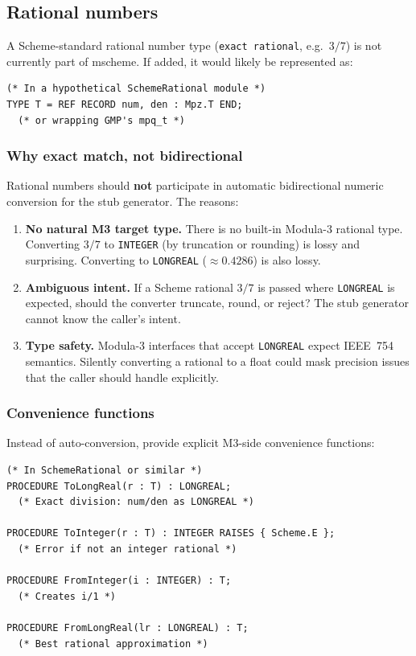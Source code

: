 \documentclass[11pt]{article}
\begin{document}
\subsection{Rational numbers}

A Scheme-standard rational number type (\texttt{exact rational},
e.g.\ $3/7$) is not currently part of mscheme.  If added, it would
likely be represented as:

\begin{lstlisting}
(* In a hypothetical SchemeRational module *)
TYPE T = REF RECORD num, den : Mpz.T END;
  (* or wrapping GMP's mpq_t *)
\end{lstlisting}

\subsubsection{Why exact match, not bidirectional}

Rational numbers should \textbf{not} participate in automatic
bidirectional numeric conversion for the stub generator.  The reasons:

\begin{enumerate}
\item \textbf{No natural M3 target type.}  There is no built-in
  Modula-3 rational type.  Converting $3/7$ to \texttt{INTEGER} (by
  truncation or rounding) is lossy and surprising.  Converting to
  \texttt{LONGREAL} ($\approx 0.4286$) is also lossy.

\item \textbf{Ambiguous intent.}  If a Scheme rational $3/7$ is passed
  where \texttt{LONGREAL} is expected, should the converter truncate,
  round, or reject?  The stub generator cannot know the caller's intent.

\item \textbf{Type safety.}  Modula-3 interfaces that accept
  \texttt{LONGREAL} expect IEEE~754 semantics.  Silently converting
  a rational to a float could mask precision issues that the caller
  should handle explicitly.
\end{enumerate}

\subsubsection{Convenience functions}

Instead of auto-conversion, provide explicit M3-side convenience
functions:

\begin{lstlisting}
(* In SchemeRational or similar *)
PROCEDURE ToLongReal(r : T) : LONGREAL;
  (* Exact division: num/den as LONGREAL *)

PROCEDURE ToInteger(r : T) : INTEGER RAISES { Scheme.E };
  (* Error if not an integer rational *)

PROCEDURE FromInteger(i : INTEGER) : T;
  (* Creates i/1 *)

PROCEDURE FromLongReal(lr : LONGREAL) : T;
  (* Best rational approximation *)
\end{lstlisting}
\end{document}
